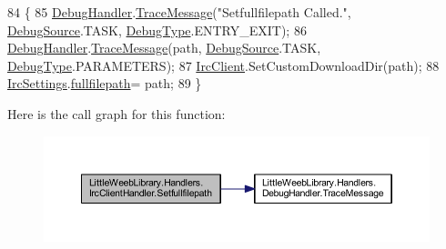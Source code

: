 \begin{DoxyCode}
84         \{
85             \mbox{\hyperlink{class_little_weeb_library_1_1_handlers_1_1_irc_client_handler_ab50ece494948d25db1839f4d6eab038f}{DebugHandler}}.\mbox{\hyperlink{interface_little_weeb_library_1_1_handlers_1_1_i_debug_handler_a2e405bc3492e683cd3702fae125221bc}{TraceMessage}}(\textcolor{stringliteral}{"Setfullfilepath Called."}, 
      \mbox{\hyperlink{namespace_little_weeb_library_1_1_handlers_a2a6ca0775121c9c503d58aa254d292be}{DebugSource}}.TASK, \mbox{\hyperlink{namespace_little_weeb_library_1_1_handlers_ab66019ed40462876ec4e61bb3ccb0a62}{DebugType}}.ENTRY\_EXIT);
86             \mbox{\hyperlink{class_little_weeb_library_1_1_handlers_1_1_irc_client_handler_ab50ece494948d25db1839f4d6eab038f}{DebugHandler}}.\mbox{\hyperlink{interface_little_weeb_library_1_1_handlers_1_1_i_debug_handler_a2e405bc3492e683cd3702fae125221bc}{TraceMessage}}(path, \mbox{\hyperlink{namespace_little_weeb_library_1_1_handlers_a2a6ca0775121c9c503d58aa254d292be}{DebugSource}}.TASK, 
      \mbox{\hyperlink{namespace_little_weeb_library_1_1_handlers_ab66019ed40462876ec4e61bb3ccb0a62}{DebugType}}.PARAMETERS);
87             \mbox{\hyperlink{class_little_weeb_library_1_1_handlers_1_1_irc_client_handler_a1c78638ea8025b27bb3e604f432ce325}{IrcClient}}.SetCustomDownloadDir(path);
88             \mbox{\hyperlink{class_little_weeb_library_1_1_settings_1_1_irc_settings}{IrcSettings}}.\mbox{\hyperlink{class_little_weeb_library_1_1_settings_1_1_irc_settings_ad1f67b09e16ba2b5fed2dcdefeac8e1a}{fullfilepath}}= path;
89         \}
\end{DoxyCode}
Here is the call graph for this function\+:\nopagebreak
\begin{figure}[H]
\begin{center}
\leavevmode
\includegraphics[width=350pt]{class_little_weeb_library_1_1_handlers_1_1_irc_client_handler_aafe7e3669d3fdd8a0a3c37a240b3c574_cgraph}
\end{center}
\end{figure}
\mbox{\label{class_little_weeb_library_1_1_handlers_1_1_irc_client_handler_ae28984176dff0eda63604b8e5c25abb4}} 
